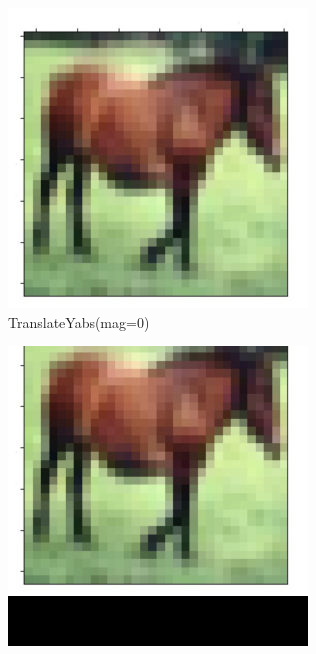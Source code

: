 \documentclass[onecolumn]{ujarticle}   %
\begin{document}
\begin{figure}[h]
      \begin{subfigure}{0.3\columnwidth}
        \centering
        \includegraphics[width=1.0\columnwidth]{transform_test/TranslateYabs_0.png}
        \caption{TranslateYabs(mag=0)}
        \label{fig:TranslateYabs_0}
      \end{subfigure}
      \begin{subfigure}{0.3\columnwidth}
        \centering
        \includegraphics[width=1.0\columnwidth]{transform_test/TranslateYabs_15.png}

\end{subfigure}
\end{figure}
\end{document}
